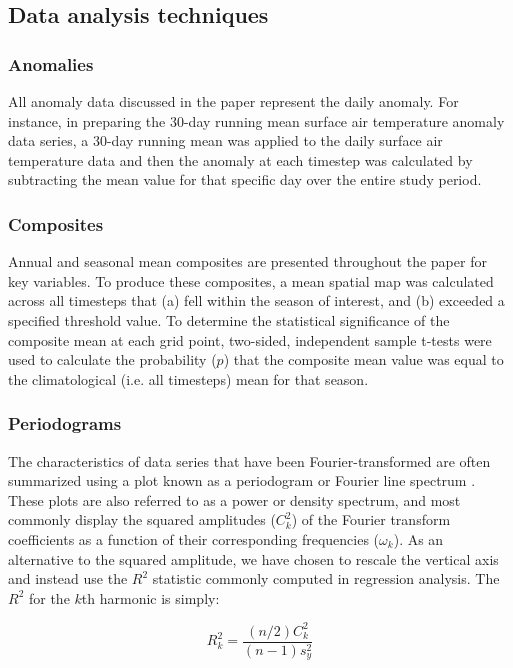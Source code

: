 \subsection{Data analysis techniques}

\subsubsection{Anomalies}
All anomaly data discussed in the paper represent the daily anomaly. For instance, in preparing the 30-day running mean surface air temperature anomaly data series, a 30-day running mean was applied to the daily surface air temperature data and then the anomaly at each timestep was calculated by subtracting the mean value for that specific day over the entire study period.

\subsubsection{Composites}
Annual and seasonal mean composites are presented throughout the paper for key variables. To produce these composites, a mean spatial map was calculated across all timesteps that (a) fell within the season of interest, and (b) exceeded a specified threshold value. To determine the statistical significance of the composite mean at each grid point, two-sided, independent sample t-tests were used to calculate the probability ($p$) that the composite mean value was equal to the climatological (i.e. all timesteps) mean for that season.

\subsubsection{Periodograms}
The characteristics of data series that have been Fourier-transformed are often summarized using a plot known as a periodogram or Fourier line spectrum \citep{Wilks2011}. These plots are also referred to as a power or density spectrum, and most commonly display the squared amplitudes ($C_k^2$) of the Fourier transform coefficients as a function of their corresponding frequencies ($\omega_k$). As an alternative to the squared amplitude, we have chosen to rescale the vertical axis and instead use the $R^2$ statistic commonly computed in regression analysis. The $R^2$ for the $k$th harmonic is simply:

\begin{equation}\label{eq:variance_explained}
R_k^2 = \frac{(n/2)C_k^2}{(n-1)s_y^2}
\end{equation}

